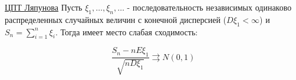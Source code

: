 \begin{enumerate}
    \hyperlink{centrallimittheorem}{ЦПТ Ляпунова} \Ths Пусть $\xi_1, \dots, \xi_n, \dots$ - последовательность независимых одинаково распределенных случайных величин
    с конечной дисперсией ($D\xi_1 < \infty$) и $S_n = \sum_{i = 1}^n \xi_i$. Тогда имеет место слабая сходимость:

    \[\frac{S_n - nE\xi_1}{\sqrt{nD\xi_1}} \rightrightarrows N(0, 1)\]


\end{enumerate}
